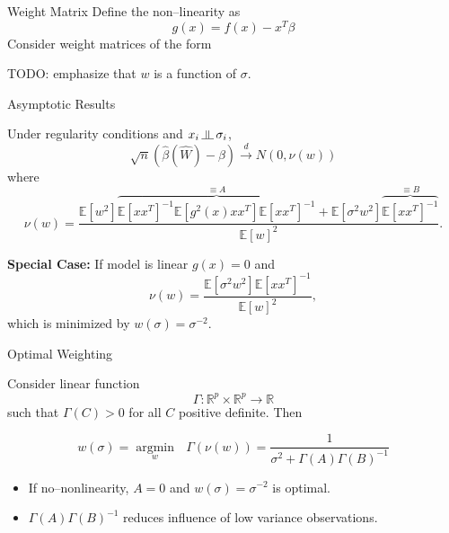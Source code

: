 \documentclass[12pt]{beamer}
\newcommand{\argmin}[1]{\underset{#1}{\operatorname{argmin}}\text{ }}
\newcommand{\E}{\mathbb{E}}
\newcommand{\todo}[1]{{\color{red}TODO: #1}}
\newcommand{\rightarrowd}{\overset{d}{\to}}
\newcommand{\indep}{\rotatebox[origin=c]{90}{$\models$}}
\begin{document}
\begin{frame}{Weight Matrix}
  Define the non--linearity as
  \begin{equation*}
    g(x) = f(x) - x^T\beta
  \end{equation*}
  Consider weight matrices of the form

  \todo{emphasize that $w$ is a function of $\sigma$.}
\end{frame}

\begin{frame}{Asymptotic Results}

  \begin{theorem}
    Under regularity conditions and $x_i \, \indep \, \sigma_i$,
  \begin{equation*}
    \sqrt{n}(\widehat{\beta}(\widehat{W}) - \beta) \rightarrowd N(0,\nu(w))
  \end{equation*}
  where
  \begin{equation*}
    \nu(w) = \frac{\E[w^2]\overbrace{\E[xx^T]^{-1}\E[g^2(x)xx^T]\E[xx^T]^{-1}}^{\equiv A} + \E[\sigma^2w^2]\overbrace{\E[xx^T]^{-1}}^{\equiv B}}{\E[w]^2}.
  \end{equation*}
  \end{theorem}
  
  \textbf{Special Case:}
   If model is linear $g(x)=0$ and
    \begin{equation*}
      \nu(w) = \frac{\E[\sigma^2w^2]\E[xx^T]^{-1}}{\E[w]^2},
    \end{equation*}
   which is minimized by $w(\sigma) = \sigma^{-2}$.
  
\end{frame}

\begin{frame}{Optimal Weighting}

  Consider linear function
  \begin{equation*}
    \Gamma: \mathbb{R}^p \times \mathbb{R}^p \rightarrow \mathbb{R}
  \end{equation*}
  such that $\Gamma(C) > 0$ for all $C$ positive definite. Then
  
  \begin{theorem}
    \begin{equation*}
      w(\sigma) = \argmin{w} \Gamma(\nu(w)) = \frac{1}{\sigma^2 + \Gamma(A)\Gamma(B)^{-1}}
    \end{equation*}
    \end{theorem}

  \begin{itemize}
  \item If no--nonlinearity, $A=0$ and $w(\sigma) = \sigma^{-2}$ is optimal.
  \item $\Gamma(A)\Gamma(B)^{-1}$ reduces influence of low variance observations.
  \end{itemize}

\end{frame}
\end{document}
